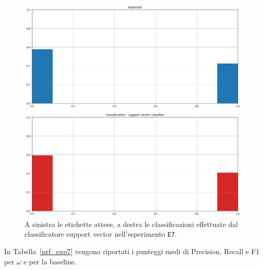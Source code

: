 \documentclass[12pt]{report}
\theoremstyle{definition}
\begin{document}
\begin{figure}
\centering
    \begin{minipage}{0.48\textwidth}
        \includegraphics[width=\linewidth]{images/experiment_kaggle/expected_classification.png}
    \end{minipage}
    \begin{minipage}{0.48\textwidth}
        \includegraphics[width=\linewidth]{images/experiment_kaggle/prediction_classification_svc.png}
    \end{minipage}
    \caption{A sinistra le etichette attese, a destra le classificazioni effettuate dal classificatore support vector nell'esperimento \texttt{E7}.}
    \label{svc_exp7}
\end{figure} 
In Tabella~\ref{prf_exp7} vengono riportati i punteggi medi di Precision, Recall e F1 per $\omega$ e per la baseline.
\end{document}
